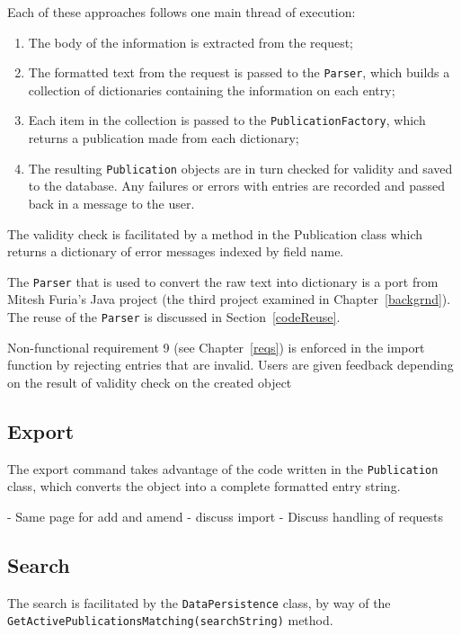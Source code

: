 Each of these approaches follows one main thread of execution:
\begin{enumerate}
	\item The body of the information is extracted from the request;
	\item The \bibtex{} formatted text from the request is passed to the \texttt{Parser}, which builds a collection of dictionaries containing the information on each entry;
	\item Each item in the collection is passed to the \texttt{PublicationFactory}, which returns a publication made from each dictionary;
	\item The resulting \texttt{Publication} objects are in turn checked for validity and saved to the database. Any failures or errors with entries are recorded and passed back in a message to the user.
\end{enumerate}

The validity check is facilitated by a method in the Publication class which returns a dictionary of error messages indexed by field name.  

The \texttt{Parser} that is used to convert the raw text into dictionary is a port from Mitesh Furia's Java project (the third project examined in Chapter~\ref{backgrnd}).  The reuse of the \texttt{Parser} is discussed in Section~\ref{codeReuse}.

Non-functional requirement 9 (see Chapter~\ref{reqs}) is enforced in the import function by rejecting entries that are invalid.  Users are given feedback depending on the result of validity check on the created object

\subsection{Export}
The export command takes advantage of the code written in the \texttt{Publication} class, which converts the object into a complete formatted \bibtex{} entry string.  




 - Same page for add and amend
 - discuss import
 - 
Discuss handling of requests

\subsection{Search}
\label{searchCore}
The search is facilitated by the \texttt{DataPersistence} class, by way of the \texttt{GetActivePublicationsMatching(searchString)} method.  

